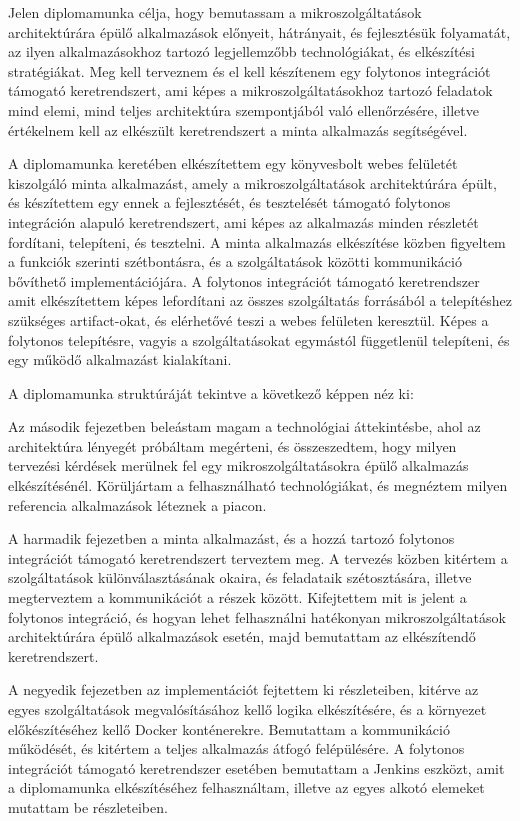 \documentclass[11pt,magyar,a4paper,twoside,]{report}
\begin{document}
Jelen diplomamunka célja, hogy bemutassam a mikroszolgáltatások
architektúrára épülő alkalmazások előnyeit, hátrányait, és fejlesztésük
folyamatát, az ilyen alkalmazásokhoz tartozó legjellemzőbb
technológiákat, és elkészítési stratégiákat. Meg kell terveznem és el
kell készítenem egy folytonos integrációt támogató keretrendszert, ami
képes a mikroszolgáltatásokhoz tartozó feladatok mind elemi, mind teljes
architektúra szempontjából való ellenőrzésére, illetve értékelnem kell
az elkészült keretrendszert a minta alkalmazás segítségével.

A diplomamunka keretében elkészítettem egy könyvesbolt webes felületét
kiszolgáló minta alkalmazást, amely a mikroszolgáltatások architektúrára
épült, és készítettem egy ennek a fejlesztését, és tesztelését támogató
folytonos integráción alapuló keretrendszert, ami képes az alkalmazás
minden részletét fordítani, telepíteni, és tesztelni. A minta alkalmazás
elkészítése közben figyeltem a funkciók szerinti szétbontásra, és a
szolgáltatások közötti kommunikáció bővíthető implementációjára. A
folytonos integrációt támogató keretrendszer amit elkészítettem képes
lefordítani az összes szolgáltatás forrásából a telepítéshez szükséges
artifact-okat, és elérhetővé teszi a webes felületen keresztül. Képes a
folytonos telepítésre, vagyis a szolgáltatásokat egymástól függetlenül
telepíteni, és egy működő alkalmazást kialakítani.

A diplomamunka struktúráját tekintve a következő képpen néz ki:

Az második fejezetben beleástam magam a technológiai áttekintésbe, ahol
az architektúra lényegét próbáltam megérteni, és összeszedtem, hogy
milyen tervezési kérdések merülnek fel egy mikroszolgáltatásokra épülő
alkalmazás elkészítésénél. Körüljártam a felhasználható technológiákat,
és megnéztem milyen referencia alkalmazások léteznek a piacon.

A harmadik fejezetben a minta alkalmazást, és a hozzá tartozó folytonos
integrációt támogató keretrendszert terveztem meg. A tervezés közben
kitértem a szolgáltatások különválasztásának okaira, és feladataik
szétosztására, illetve megterveztem a kommunikációt a részek között.
Kifejtettem mit is jelent a folytonos integráció, és hogyan lehet
felhasználni hatékonyan mikroszolgáltatások architektúrára épülő
alkalmazások esetén, majd bemutattam az elkészítendő keretrendszert.

A negyedik fejezetben az implementációt fejtettem ki részleteiben,
kitérve az egyes szolgáltatások megvalósításához kellő logika
elkészítésére, és a környezet előkészítéséhez kellő Docker konténerekre.
Bemutattam a kommunikáció működését, és kitértem a teljes alkalmazás
átfogó felépülésére. A folytonos integrációt támogató keretrendszer
esetében bemutattam a Jenkins eszközt, amit a diplomamunka
elkészítéséhez felhasználtam, illetve az egyes alkotó elemeket mutattam
be részleteiben.
\end{document}
